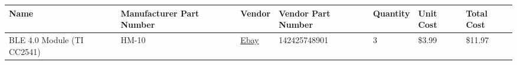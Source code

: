 \documentclass[]{article}
\begin{document}
\begin{longtable}[]{@{}lllllll@{}}
\toprule
\begin{minipage}[b]{0.15\columnwidth}\raggedright
Name\strut
\end{minipage} & \begin{minipage}[b]{0.15\columnwidth}\raggedright
Manufacturer Part Number\strut
\end{minipage} & \begin{minipage}[b]{0.10\columnwidth}\raggedright
Vendor\strut
\end{minipage} & \begin{minipage}[b]{0.17\columnwidth}\raggedright
Vendor Part Number\strut
\end{minipage} & \begin{minipage}[b]{0.11\columnwidth}\raggedright
Quantity\strut
\end{minipage} & \begin{minipage}[b]{0.06\columnwidth}\raggedright
Unit Cost\strut
\end{minipage} & \begin{minipage}[b]{0.07\columnwidth}\raggedright
Total Cost\strut
\end{minipage}\tabularnewline
\midrule
\endhead
\begin{minipage}[t]{0.15\columnwidth}\raggedright
BLE 4.0 Module (TI CC2541)\strut
\end{minipage} & \begin{minipage}[t]{0.15\columnwidth}\raggedright
HM-10\strut
\end{minipage} & \begin{minipage}[t]{0.10\columnwidth}\raggedright
\href{https://www.ebay.com/itm/AT-09-BLE-Bluetooth-4-0-Uart-Transceiver-Module-CC2541-Central-Switching-HM-10/142425748901?ssPageName=STRK\%3AMEBIDX\%3AIT\&_trksid=p2057872.m2749.l2649}{Ebay}\strut
\end{minipage} & \begin{minipage}[t]{0.17\columnwidth}\raggedright
142425748901\strut
\end{minipage} & \begin{minipage}[t]{0.11\columnwidth}\raggedright
3\strut
\end{minipage} & \begin{minipage}[t]{0.06\columnwidth}\raggedright
\$3.99\strut
\end{minipage} & \begin{minipage}[t]{0.07\columnwidth}\raggedright
\$11.97\strut
\end{minipage}\tabularnewline

\end{longtable}
\end{document}
